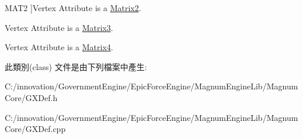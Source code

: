 \begin{Desc}
\begin{description}
{M\+A\+T2\hypertarget{class_i_dream_sky_1_1_g_x_shader_attribute_type_a6a608f7303cc5ff374f58b3a2f2f9716a8a0e354a74c032610cfe04a06843b146}{}\label{class_i_dream_sky_1_1_g_x_shader_attribute_type_a6a608f7303cc5ff374f58b3a2f2f9716a8a0e354a74c032610cfe04a06843b146}
}]Vertex Attribute is a \hyperlink{class_i_dream_sky_1_1_matrix2}{Matrix2}. \item[{\em 
M\+A\+T3\hypertarget{class_i_dream_sky_1_1_g_x_shader_attribute_type_a6a608f7303cc5ff374f58b3a2f2f9716a421fc640f8fba316103704875788674b}{}\label{class_i_dream_sky_1_1_g_x_shader_attribute_type_a6a608f7303cc5ff374f58b3a2f2f9716a421fc640f8fba316103704875788674b}
}]Vertex Attribute is a \hyperlink{class_i_dream_sky_1_1_matrix3}{Matrix3}. \item[{\em 
M\+A\+T4\hypertarget{class_i_dream_sky_1_1_g_x_shader_attribute_type_a6a608f7303cc5ff374f58b3a2f2f9716a0aab67099d57d02f864d9da96bf7148e}{}\label{class_i_dream_sky_1_1_g_x_shader_attribute_type_a6a608f7303cc5ff374f58b3a2f2f9716a0aab67099d57d02f864d9da96bf7148e}
}]Vertex Attribute is a \hyperlink{class_i_dream_sky_1_1_matrix4}{Matrix4}. \end{description}
\end{Desc}


此類別(class) 文件是由下列檔案中產生\+:\begin{DoxyCompactItemize}
\item 
C\+:/innovation/\+Government\+Engine/\+Epic\+Force\+Engine/\+Magnum\+Engine\+Lib/\+Magnum\+Core/G\+X\+Def.\+h\item 
C\+:/innovation/\+Government\+Engine/\+Epic\+Force\+Engine/\+Magnum\+Engine\+Lib/\+Magnum\+Core/G\+X\+Def.\+cpp\end{DoxyCompactItemize}
